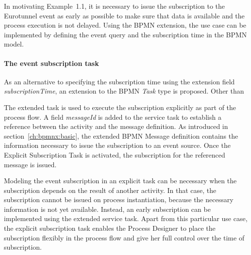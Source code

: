 
In motivating Example~1.1, it is necessary to issue the subscription to the Eurotunnel event as early as possible to make sure that data is available and the process execution is not delayed.
Using the BPMN extension, the use case can be implemented by defining the event query and the subscription time in the BPMN model. 


\paragraph{The event subscription task\newline}
As an alternative to specifying the subscription time using the extension field \textit{subscriptionTime}, an extension to the BPMN \textit{Task} type is proposed. 
Other than \cite{mandal:2017} 




The extended task is used to execute the subscription explicitly as part of the process flow.
A field \textit{messageId} is added to the service task to establish a reference between the activity and the message definition.
As introduced in section~\autoref{ch:bpmnx:basic}, the extended BPMN Message definition contains the information necessary to issue the subscription to an event source.
Once the Explicit Subscription Task is activated, the subscription for the referenced message is issued. 

Modeling the event subscription in an explicit task can be necessary when the subscription depends on the result of another activity. In that case, the subscription cannot be issued on process instantiation, because the necessary information is not yet available. Instead, an early subscription can be implemented using the extended service task.
Apart from this particular use case, the explicit subscription task enables the Process Designer to place the subscription flexibly in the process flow and give her full control over the time of subscription.


